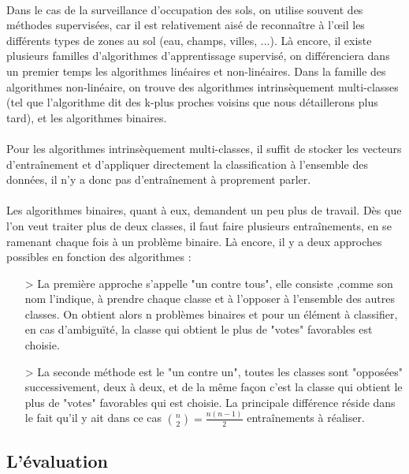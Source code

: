 \paragraph{}
Dans le cas de la surveillance d'occupation des sols, on utilise souvent des méthodes supervisées, car il est relativement aisé de reconnaître à l'œil les différents types de zones au sol (eau, champs, villes, ...). Là encore, il existe plusieurs familles d'algorithmes d'apprentissage supervisé, on différenciera dans un premier temps les algorithmes linéaires et non-linéaires. Dans la famille des algorithmes non-linéaire, on trouve des algorithmes intrinsèquement multi-classes (tel que l'algorithme dit des k-plus proches voisins que nous détaillerons plus tard), et les algorithmes binaires.
\paragraph{}
Pour les algorithmes intrinsèquement multi-classes, il suffit de stocker les vecteurs d’entraînement et d'appliquer directement la classification à l'ensemble des données, il n'y a donc pas d’entraînement à proprement parler.
\paragraph{}
Les algorithmes binaires, quant à eux, demandent un peu plus de travail. Dès que l'on veut traiter plus de deux classes, il faut faire plusieurs entraînements, en se ramenant chaque fois à un problème binaire. Là encore, il y a deux approches possibles en fonction des algorithmes :
 \begin{itemize}
   \item[>] La première approche s'appelle "un contre tous", elle consiste ,comme son nom l'indique, à prendre chaque classe et à l'opposer à l'ensemble des autres classes. On obtient alors n problèmes binaires et pour un élément à classifier, en cas d'ambiguïté, la classe qui obtient le plus de "votes" favorables est choisie.
   \item[>] La seconde méthode est le "un contre un", toutes les classes sont "opposées" successivement, deux à deux, et de la même façon c'est la classe qui obtient le plus de "votes" favorables qui est choisie. La principale différence réside dans le fait qu'il y ait dans ce cas ${n \choose 2}=\frac{n(n-1)}{2}$ entraînements à réaliser.
 \end{itemize}
\subsection{L'évaluation}
